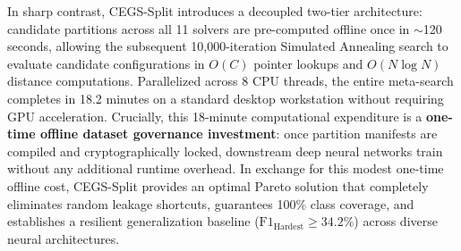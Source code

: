 \documentclass[a4paper,fleqn]{cas-sc}
\begin{document}
In sharp contrast, CEGS-Split introduces a decoupled two-tier architecture: candidate partitions across all 11 solvers are pre-computed offline once in $\sim$120 seconds, allowing the subsequent 10,000-iteration Simulated Annealing search to evaluate candidate configurations in $O(C)$ pointer lookups and $O(N \log N)$ distance computations. Parallelized across 8 CPU threads, the entire meta-search completes in 18.2 minutes on a standard desktop workstation without requiring GPU acceleration. Crucially, this 18-minute computational expenditure is a \textbf{one-time offline dataset governance investment}: once partition manifests are compiled and cryptographically locked, downstream deep neural networks train without any additional runtime overhead. In exchange for this modest one-time offline cost, CEGS-Split provides an optimal Pareto solution that completely eliminates random leakage shortcuts, guarantees 100\% class coverage, and establishes a resilient generalization baseline ($\mathrm{F1}_{\text{Hardest}} \ge 34.2\%$) across diverse neural architectures.
\end{document}
